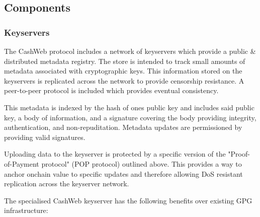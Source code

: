 \documentclass{article}
\begin{document}
\subsection{Components}

\subsubsection{Keyservers}

The CashWeb protocol includes a network of keyservers which provide a public \& distributed metadata registry. The store is intended to track small amounts of metadata associated with cryptographic keys. This information stored on the keyservers is replicated across the network to provide censorship resistance. A peer-to-peer protocol is included which provides eventual consistency.

This metadata is indexed by the hash of ones public key and includes said public key, a body of information, and a signature covering the body providing integrity, authentication, and non-repuditation. Metadata updates are permissioned by providing valid signatures.



Uploading data to the keyserver is protected by a specific version of the "Proof-of-Payment protocol" (POP protocol) outlined above. This provides a way to anchor onchain value to specific updates and therefore allowing DoS resistant replication across the keyserver network.

The specialised CashWeb keyserver has the following benefits over existing GPG infrastructure:
\end{document}
